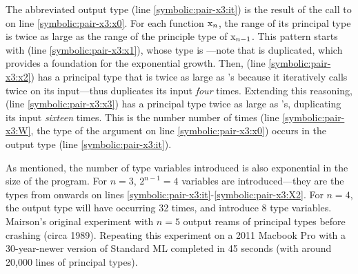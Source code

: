 The abbreviated output type  (line \ref{symbolic:pair-x3:it}) is the result of the call to 
on line \ref{symbolic:pair-x3:x0}.
For each function $\text{\sml{x}}_n$, the range of its principal type is twice as large as
the range of the principle type of $\text{\sml{x}}_{n-1}$.
This pattern starts with  (line \ref{symbolic:pair-x3:x1}),
whose type is ---note that 
is duplicated, which provides a foundation for the exponential growth.
Then,  (line \ref{symbolic:pair-x3:x2})
has a principal type that is twice as large as 's because it
iteratively calls  twice on its input---thus  duplicates its input \emph{four} times.
Extending this reasoning,  (line \ref{symbolic:pair-x3:x3})
has a principal type twice as large as 's,
duplicating its input \emph{sixteen} times.
This is the number number of times  (line \ref{symbolic:pair-x3:W},
the type of the argument  on line \ref{symbolic:pair-x3:x0})
occurs in the output type (line \ref{symbolic:pair-x3:it}).

As mentioned, the number of type variables introduced is also exponential
in the size of the program. For $n=3$, $2^{n-1}=4$ variables are introduced---they are the types from
 onwards on lines \ref{symbolic:pair-x3:it}-\ref{symbolic:pair-x3:X2}.
For $n=4$, the output type will have  occurring 32 times,
and introduce 8 type variables.
Mairson's original experiment with $n=5$ output reams of principal
types before crashing (circa 1989).
Repeating this experiment on a 2011 Macbook Pro with a 30-year-newer version of Standard ML
completed in 45 seconds (with around 20,000 lines of principal types).


